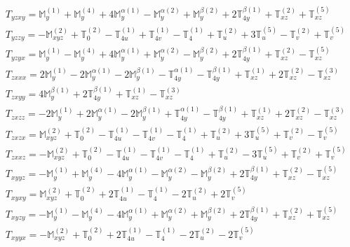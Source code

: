 \documentclass[fleqn,8pt,landscape]{jsarticle}
\begin{document}
\begin{align*}
& T_{yzxy} = \mathbb{M}_{y}^{(1)} + \mathbb{M}_{y}^{(4)} + 4 \mathbb{M}_{y}^{\alpha(1)} - \mathbb{M}_{y}^{\alpha(2)} + \mathbb{M}_{y}^{\beta(2)} + 2 \mathbb{T}_{4y}^{\beta(1)} + \mathbb{T}_{xz}^{(2)} + \mathbb{T}_{xz}^{(5)} \\
& T_{yzzy} = - \mathbb{M}_{xyz}^{(2)} + \mathbb{T}_{0}^{(2)} - \mathbb{T}_{4u}^{(1)} + \mathbb{T}_{4v}^{(1)} - \mathbb{T}_{4}^{(1)} + \mathbb{T}_{u}^{(2)} + 3 \mathbb{T}_{u}^{(5)} - \mathbb{T}_{v}^{(2)} + \mathbb{T}_{v}^{(5)} \\
& T_{yzyx} = \mathbb{M}_{y}^{(1)} - \mathbb{M}_{y}^{(4)} + 4 \mathbb{M}_{y}^{\alpha(1)} + \mathbb{M}_{y}^{\alpha(2)} - \mathbb{M}_{y}^{\beta(2)} + 2 \mathbb{T}_{4y}^{\beta(1)} + \mathbb{T}_{xz}^{(2)} - \mathbb{T}_{xz}^{(5)} \\
& T_{zxxx} = 2 \mathbb{M}_{y}^{(1)} - 2 \mathbb{M}_{y}^{\alpha(1)} - 2 \mathbb{M}_{y}^{\beta(1)} - \mathbb{T}_{4y}^{\alpha(1)} - \mathbb{T}_{4y}^{\beta(1)} + \mathbb{T}_{xz}^{(1)} + 2 \mathbb{T}_{xz}^{(2)} - \mathbb{T}_{xz}^{(3)} \\
& T_{zxyy} = 4 \mathbb{M}_{y}^{\beta(1)} + 2 \mathbb{T}_{4y}^{\beta(1)} + \mathbb{T}_{xz}^{(1)} - \mathbb{T}_{xz}^{(3)} \\
& T_{zxzz} = - 2 \mathbb{M}_{y}^{(1)} + 2 \mathbb{M}_{y}^{\alpha(1)} - 2 \mathbb{M}_{y}^{\beta(1)} + \mathbb{T}_{4y}^{\alpha(1)} - \mathbb{T}_{4y}^{\beta(1)} + \mathbb{T}_{xz}^{(1)} + 2 \mathbb{T}_{xz}^{(2)} - \mathbb{T}_{xz}^{(3)} \\
& T_{zxzx} = \mathbb{M}_{xyz}^{(2)} + \mathbb{T}_{0}^{(2)} - \mathbb{T}_{4u}^{(1)} - \mathbb{T}_{4v}^{(1)} - \mathbb{T}_{4}^{(1)} + \mathbb{T}_{u}^{(2)} + 3 \mathbb{T}_{u}^{(5)} + \mathbb{T}_{v}^{(2)} - \mathbb{T}_{v}^{(5)} \\
& T_{zxxz} = - \mathbb{M}_{xyz}^{(2)} + \mathbb{T}_{0}^{(2)} - \mathbb{T}_{4u}^{(1)} - \mathbb{T}_{4v}^{(1)} - \mathbb{T}_{4}^{(1)} + \mathbb{T}_{u}^{(2)} - 3 \mathbb{T}_{u}^{(5)} + \mathbb{T}_{v}^{(2)} + \mathbb{T}_{v}^{(5)} \\
& T_{xyyz} = - \mathbb{M}_{y}^{(1)} + \mathbb{M}_{y}^{(4)} - 4 \mathbb{M}_{y}^{\alpha(1)} - \mathbb{M}_{y}^{\alpha(2)} - \mathbb{M}_{y}^{\beta(2)} + 2 \mathbb{T}_{4y}^{\beta(1)} + \mathbb{T}_{xz}^{(2)} - \mathbb{T}_{xz}^{(5)} \\
& T_{xyxy} = \mathbb{M}_{xyz}^{(2)} + \mathbb{T}_{0}^{(2)} + 2 \mathbb{T}_{4u}^{(1)} - \mathbb{T}_{4}^{(1)} - 2 \mathbb{T}_{u}^{(2)} + 2 \mathbb{T}_{v}^{(5)} \\
& T_{xyzy} = - \mathbb{M}_{y}^{(1)} - \mathbb{M}_{y}^{(4)} - 4 \mathbb{M}_{y}^{\alpha(1)} + \mathbb{M}_{y}^{\alpha(2)} + \mathbb{M}_{y}^{\beta(2)} + 2 \mathbb{T}_{4y}^{\beta(1)} + \mathbb{T}_{xz}^{(2)} + \mathbb{T}_{xz}^{(5)} \\
& T_{xyyx} = - \mathbb{M}_{xyz}^{(2)} + \mathbb{T}_{0}^{(2)} + 2 \mathbb{T}_{4u}^{(1)} - \mathbb{T}_{4}^{(1)} - 2 \mathbb{T}_{u}^{(2)} - 2 \mathbb{T}_{v}^{(5)}
\end{align*}
\end{document}
